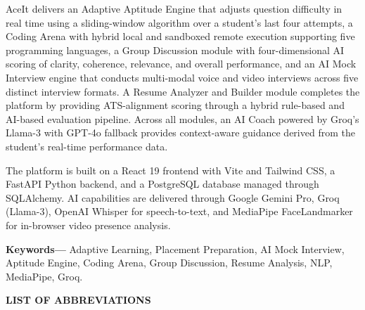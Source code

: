 \documentclass[12pt,a4paper]{report}
\renewcommand{\headrulewidth}{0.4pt}
\renewcommand{\footrulewidth}{0.4pt}
\renewcommand{\headrulewidth}{0pt}
\renewcommand{\footrulewidth}{0.4pt}
\begin{document}
\vspace{0.3cm}
\noindent
AceIt delivers an Adaptive Aptitude Engine that adjusts question difficulty in real time using a sliding-window algorithm over a student's last four attempts, a Coding Arena with hybrid local and sandboxed remote execution supporting five programming languages, a Group Discussion module with four-dimensional AI scoring of clarity, coherence, relevance, and overall performance, and an AI Mock Interview engine that conducts multi-modal voice and video interviews across five distinct interview formats. A Resume Analyzer and Builder module completes the platform by providing ATS-alignment scoring through a hybrid rule-based and AI-based evaluation pipeline. Across all modules, an AI Coach powered by Groq's Llama-3 with GPT-4o fallback provides context-aware guidance derived from the student's real-time performance data.

\vspace{0.3cm}
\noindent
The platform is built on a React 19 frontend with Vite and Tailwind CSS, a FastAPI Python backend, and a PostgreSQL database managed through SQLAlchemy. AI capabilities are delivered through Google Gemini Pro, Groq (Llama-3), OpenAI Whisper for speech-to-text, and MediaPipe FaceLandmarker for in-browser video presence analysis.

\vspace{0.3cm}
\noindent
\textbf{Keywords---} Adaptive Learning, Placement Preparation, AI Mock Interview, Aptitude Engine, Coding Arena, Group Discussion, Resume Analysis, NLP, MediaPipe, Groq.
\clearpage

\clearpage
\pagestyle{fancy}
\fancyhf{}
\fancyfoot[C]{\thepage}
\renewcommand{\headrulewidth}{0pt}
\renewcommand{\footrulewidth}{0.4pt}
\tableofcontents
\clearpage
{}
\listoffigures
\clearpage
{}
\listoftables
\clearpage

\begin{center}
    {\large\bfseries LIST OF ABBREVIATIONS}
\end{center}
\vspace{0.5cm}
\end{document}
